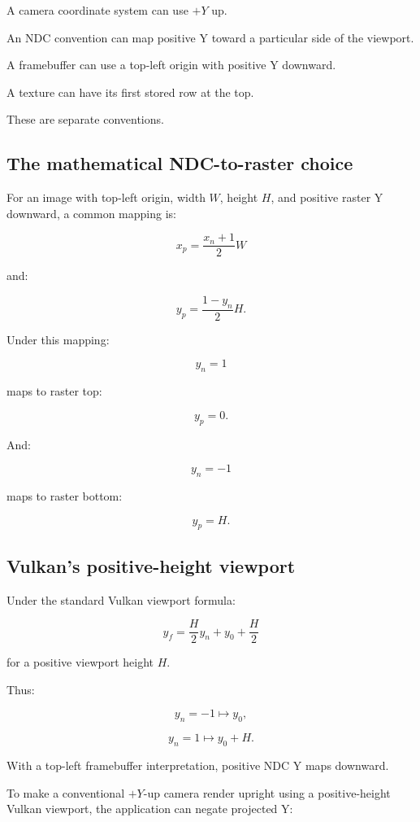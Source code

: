 A camera coordinate system can use \(+Y\) up.

An NDC convention can map positive Y toward a particular side of the viewport.

A framebuffer can use a top-left origin with positive Y downward.

A texture can have its first stored row at the top.

These are separate conventions.

\subsection{The mathematical NDC-to-raster choice}\label{02-foundations-ii-ch033-the-mathematical-ndc-to-raster-choice}

For an image with top-left origin, width \(W\), height \(H\), and positive raster Y downward, a common mapping is:

\[
 \boxed{ x_p=\frac{x_n+1}{2}W }
\]

and:

\[
 \boxed{ y_p=\frac{1-y_n}{2}H }.
\]

Under this mapping:

\[
 y_n=1
\]

maps to raster top:

\[
 y_p=0.
\]

And:

\[
 y_n=-1
\]

maps to raster bottom:

\[
 y_p=H.
\]

\subsection{Vulkan's positive-height viewport}\label{02-foundations-ii-ch033-vulkans-positive-height-viewport}

Under the standard Vulkan viewport formula:

\[
 y_f=\frac{H}{2}y_n+y_0+\frac H2
\]

for a positive viewport height \(H\).

Thus:

\[
 y_n=-1\mapsto y_0,
\]

\[
 y_n=1\mapsto y_0+H.
\]

With a top-left framebuffer interpretation, positive NDC Y maps downward.

To make a conventional \(+Y\)-up camera render upright using a positive-height Vulkan viewport, the application can negate projected Y:

